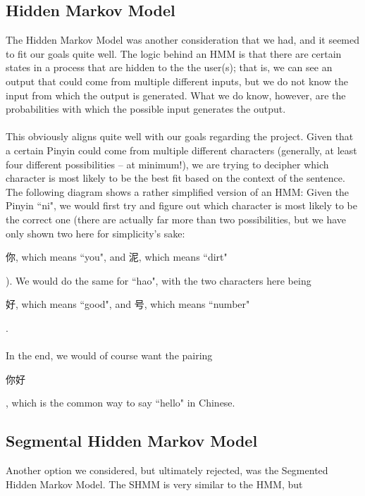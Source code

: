 \documentclass[11pt, twocolumn]{article}
\makeatletter
\newenvironment{problem x}{\@startsection
       {section}
       {1}
       {-.2em}
       {-3.5ex plus -1ex minus -.2ex}
       {2.3ex plus .2ex}
       {\pagebreak[3] %
       \large\bf\noindent{Problem }
       }
       }
       {%
       \begin{center}\large\bf \ldots\ldots\ldots\end{center}}
\makeatother
\begin{document}
\subsection{Hidden Markov Model}
The Hidden Markov Model was another consideration that we had, and it seemed to fit our goals quite well. The logic behind an HMM is that there are certain states in a process that are hidden to the the user(s); that is, we can see an output that could come from multiple different inputs, but we do not know the input from which the output is generated. What we do know, however, are the probabilities with which the possible input generates the output.
\\\\
This obviously aligns quite well with our goals regarding the project. Given that a certain Pinyin could come from multiple different characters (generally, at least four different possibilities -- at minimum!), we are trying to decipher which character is most likely to be the best fit based on the context of the sentence. The following diagram shows a rather simplified version of an HMM:
Given the Pinyin ``ni", we would first try and figure out which character is most likely to be the correct one (there are actually far more than two possibilities, but we have only shown two here for simplicity's sake: \begin{CJK}{UTF8}{gbsn}你, which means ``you", and 泥, which means ``dirt" \end{CJK}). We would do the same for ``hao", with the two characters here being \begin{CJK}{UTF8}{gbsn}好, which means ``good", and 号, which means ``number" \end{CJK}.
\\\\
In the end, we would of course want the pairing \begin{CJK}{UTF8}{gbsn}你好\end{CJK}, which is the common way to say ``hello" in Chinese.

\subsection{Segmental Hidden Markov Model}
Another option we considered, but ultimately rejected, was the Segmented Hidden Markov Model. The SHMM is very similar to the HMM, but 
\end{document}
